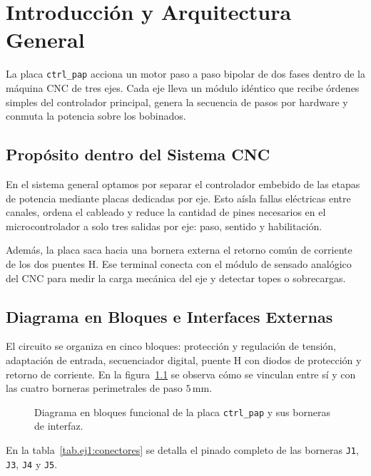 \chapter{Introducción y Arquitectura General}
\label{sec:introduccion}

La placa \texttt{ctrl\_pap} acciona un motor paso a paso bipolar de dos fases dentro de la máquina CNC de tres
ejes. Cada eje lleva un módulo idéntico que recibe órdenes simples del controlador principal, genera la secuencia
de pasos por hardware y conmuta la potencia sobre los bobinados.

\section{Propósito dentro del Sistema CNC}
\label{sec:proposito_cnc}

En el sistema general optamos por separar el controlador embebido de las etapas de potencia mediante placas
dedicadas por eje. Esto aísla fallas eléctricas entre canales, ordena el cableado y reduce la cantidad de pines
necesarios en el microcontrolador a solo tres salidas por eje: paso, sentido y habilitación.

Además, la placa saca hacia una bornera externa el retorno común de corriente de los dos puentes H. Ese terminal
conecta con el módulo de sensado analógico del CNC para medir la carga mecánica del eje y detectar topes o
sobrecargas.

\section{Diagrama en Bloques e Interfaces Externas}
\label{sec:bloques_interfaces}

El circuito se organiza en cinco bloques: protección y regulación de tensión, adaptación de entrada, secuenciador
digital, puente H con diodos de protección y retorno de corriente. En la figura~\ref{fig.ej1:bloques_placa} se
observa cómo se vinculan entre sí y con las cuatro borneras perimetrales de paso $5\,\unit{\milli\meter}$.

\begin{figure}[!ht]
  \centering
  \resizebox{\textwidth}{!}{}
  \caption{Diagrama en bloques funcional de la placa \texttt{ctrl\_pap} y sus borneras de interfaz.}
  \label{fig.ej1:bloques_placa}
\end{figure}

En la tabla~\ref{tab.ej1:conectores} se detalla el pinado completo de las borneras \texttt{J1}, \texttt{J3},
\texttt{J4} y \texttt{J5}.

